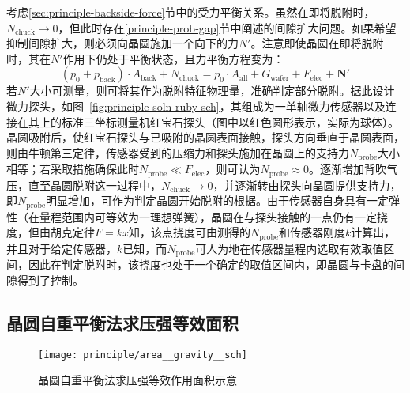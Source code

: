 考虑\ref{sec:principle-backside-force}节中的受力平衡关系。虽然在即将脱附时，$N_{\mathrm{chuck}} \to 0$，但此时存在\ref{principle-prob-gap}节中阐述的间隙扩大问题。如果希望抑制间隙扩大，则必须向晶圆施加一个向下的力$N'$。注意即使晶圆在即将脱附时，其在$N'$作用下仍处于平衡状态，且力平衡方程变为：
\begin{equation}
\label{eq:principle-soln-ruby-force}
(p_{0} + p_{\mathrm{back}}) \cdot A_{\mathrm{back}} + N_{\mathrm{chuck}} = p_0 \cdot A_{\mathrm{all}} + G_{\mathrm{wafer}} + F_{\mathrm{elec}} + \mathbf{N'}
\end{equation}
若$N'$大小可测量，则可将其作为脱附特征物理量，准确判定部分脱附。据此设计微力探头，如图~\ref{fig:principle-soln-ruby-sch}，其组成为一单轴微力传感器以及连接在其上的标准三坐标测量机红宝石探头（图中以红色圆形表示，实际为球体）。晶圆吸附后，使红宝石探头与已吸附的晶圆表面接触，探头方向垂直于晶圆表面，则由牛顿第三定律，传感器受到的压缩力和探头施加在晶圆上的支持力$N_{\mathrm{probe}}$大小相等\footnotemark{}；若采取措施确保此时$N_{\mathrm{probe}} \ll F_{\mathrm{elec}}$，则可认为$N_{\mathrm{probe}} \approx 0$。逐渐增加背吹气压，直至晶圆脱附这一过程中，$N_{\mathrm{chuck}} \to 0$，并逐渐转由探头向晶圆提供支持力，即$N_{\mathrm{probe}}$明显增加，可作为判定晶圆开始脱附的根据。由于传感器自身具有一定弹性（在量程范围内可等效为一理想弹簧），晶圆在与探头接触的一点仍有一定挠度，但由胡克定律$F = k x$知，该点挠度可由测得的$N_{\mathrm{probe}}$和传感器刚度$k$计算出，并且对于给定传感器，$k$已知，而$N_{\mathrm{probe}}$可人为地在传感器量程内选取有效取值区间，因此在判定脱附时，该挠度也处于一个确定的取值区间内，即晶圆与卡盘的间隙得到了控制。



\subsection{晶圆自重平衡法求压强等效面积}\label{sec:principle-soln-gravity}

\begin{figure}[tbhp]
\centering
\texttt{[image: principle/area\_\_gravity\_\_sch]}
\caption{晶圆自重平衡法求压强等效作用面积示意}
\label{fig:principle-area-gravity-sch}
\end{figure}

